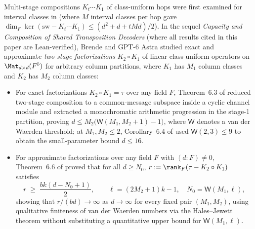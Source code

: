 Multi-stage compositions $K_t \cdots K_1$ of class-uniform hops were first examined for interval
classes in \cite[Remark~6.14 and Section~7.4]{SeventeenthPaper2026} (where $M$ interval classes per
hop gave $\dim_F\ker(\mathrm{sw} - K_t \cdots K_1) \le (d^2 + d + tMd)/2$). In the sequel
\emph{Capacity and Composition of Shared Transposition Decoders}
\cite[Section~6]{SharedDecoders2026} (where all results cited in this paper are Lean-verified),
Brende and GPT-6 Astra studied exact and approximate \emph{two-stage
factorizations} $K_2 \circ K_1$ of linear class-uniform operators on $\Mat_{d\times d}(F^b)$ for
arbitrary column partitions, where
$K_1$ has $M_1$ column classes and $K_2$ has $M_2$ column classes:
\begin{itemize}[leftmargin=1.5em]
\item For exact factorizations $K_2 \circ K_1 = \tau$ over any field $F$,
  Theorem~6.3 of \cite{SharedDecoders2026} reduced two-stage composition to a common-message subspace
  inside a cyclic channel module and extracted a monochromatic arithmetic progression in the stage-1
  partition, proving $d \le M_2\bigl(\mathsf{W}(M_1, M_2 + 1) - 1\bigr)$, where $\mathsf{W}$ denotes
  a van der Waerden threshold; at $M_1, M_2 \le 2$, Corollary~6.4 of \cite{SharedDecoders2026} used
  $\mathsf{W}(2,3) \le 9$ to obtain the small-parameter bound $d \le 16$.
\item For approximate factorizations over any field $F$ with $(d : F) \ne 0$,
  Theorem~6.6 of \cite{SharedDecoders2026}
  proved that for all $d \ge N_0$, $r := \rank_F(\tau - K_2 \circ K_1)$ satisfies
  \[
    r \;\ge\; \frac{b k (d - N_0 + 1)}{2},
    \qquad
    \ell = (2M_2 + 1)k - 1,\quad N_0 = \mathsf{W}(M_1, \ell),
  \]
  showing that $r / (bd) \to \infty$ as $d \to \infty$ for every fixed pair $(M_1, M_2)$, using
  qualitative finiteness of van der Waerden numbers via the Hales--Jewett theorem
  \cite{HalesJewett1963} without substituting a quantitative upper bound for $\mathsf{W}(M_1, \ell)$.
\end{itemize}

